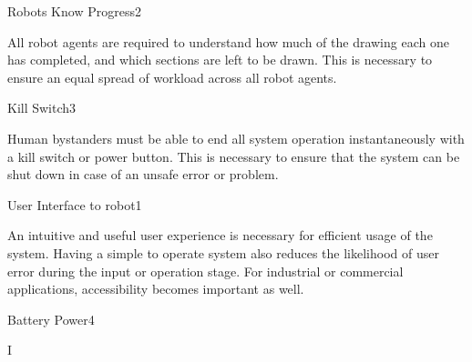 \begin{functional_requirement}{Robots Know Progress}{2}
\label{fr:know_progress}
\item All robot agents are required to understand how much of the drawing each one has completed, and which sections are left to be drawn. This is necessary to ensure an equal spread of workload across all robot agents. 
\end{functional_requirement}

\begin{functional_requirement}{Kill Switch}{3}
\label{fr:kill_switch}
\item Human bystanders must be able to end all system operation instantaneously with a kill switch or power button. This is necessary to ensure that the system can be shut down in case of an unsafe error or problem. 
\end{functional_requirement}

\begin{functional_requirement}{User Interface to robot}{1}
\label{fr:user_interface}
\item An intuitive and useful user experience is necessary for efficient usage of the system. Having a simple to operate system also reduces the likelihood of user error during the input or operation stage. For industrial or commercial applications, accessibility becomes important as well. 
\end{functional_requirement}


\begin{functional_requirement}{Battery Power}{4}
\label{fr:battery_power}
\item I
\end{functional_requirement}


